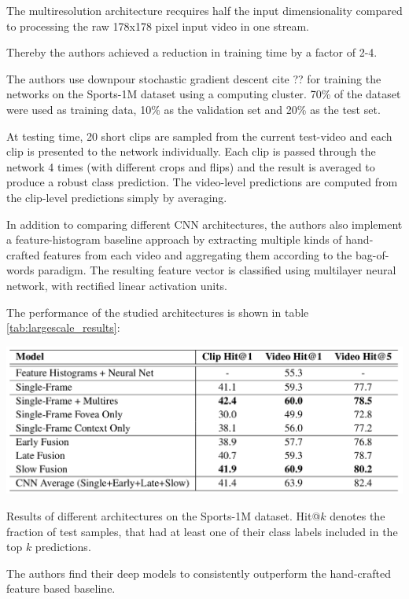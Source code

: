 The multiresolution architecture recquires half the input dimensionality compared to processing the raw 178x178 pixel input video in one stream.

Thereby the authors achieved a reduction in training time by a factor of 2-4.

The authors use downpour stochastic gradient descent cite ?? for training the networks on the Sports-1M dataset using a computing cluster.
70\% of the dataset were used as training data, 10\% as the validation set and 20\% as the test set.

At testing time, 20 short clips are sampled from the current test-video and each clip is presented to the network individually.
Each clip is passed through the network 4 times (with different crops and flips) and the result is averaged to produce a robust class prediction.
The video-level predictions are computed from the clip-level predictions simply by averaging.

In addition to comparing different CNN architectures, the authors also implement a feature-histogram baseline approach by extracting multiple kinds of hand-crafted features from each video and aggregating them according to the bag-of-words paradigm.
The resulting feature vector is classified using multilayer neural network, with rectified linear activation units.

The performance of the studied architectures is shown in table \ref{tab:largescale_results}:

\begin{table}[H]
    \centering
    \includegraphics{img_deep/largescale_results}
    \caption{Results of different architectures on the Sports-1M dataset. Hit@$k$ denotes the fraction of test samples, that had at least one of their class labels included in the top $k$ predictions. \cite{karpathy_large-scale_2014}}
    \label{tab:largescale_results}
\end{table}

The authors find their deep models to consistently outperform the hand-crafted feature based baseline.

